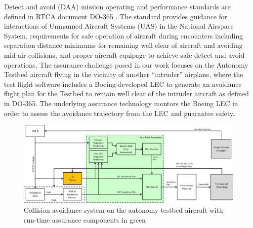 Detect and avoid (DAA) mission operating and performance standards are defined in RTCA document DO-365 \cite{DO_365}.  The standard provides guidance for interactions of Unmanned Aircraft Systems (UAS) in the National Airspace System, requirements for safe operation of aircraft during encounters including separation distance minimums for remaining well clear of aircraft and avoiding mid-air collisions, and proper aircraft equipage to achieve safe detect and avoid operations.
The assurance challenge posed in our work focuses on the Autonomy Testbed aircraft flying in the vicinity of another ``intruder'' airplane, where the test flight software includes a Boeing-developed LEC to generate an avoidance flight plan for the Testbed to remain well clear of the intruder aircraft as defined in DO-365.  The underlying assurance technology montors the Boeing LEC in order to assess the avoidance trajectory from the LEC and guarantee safety. 

\begin{figure}
	\centering
	\includegraphics[width=\textwidth]{figures/rta-arch.jpg}
	\caption{Collision avoidance system on the autonomy testbed aircraft with run-time assurance components in green}
	\label{fig:rta-arch}
\end{figure}

